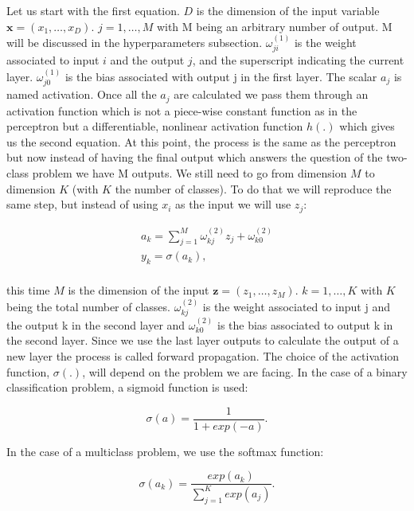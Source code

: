 \documentclass[a4paper,12pt]{article}
\numberwithin{equation}{section}
\begin{document}
Let us start with the first equation. $D$ is the dimension of the input variable $\boldsymbol{x} = (x_1,\dots,x_D)$. $j = 1,\dots,M$ with M being an arbitrary number of output. M will be discussed in the hyperparameters subsection. $\omega_{ji}^{(1)}$ is the weight associated to input $i$ and the output $j$, and the superscript indicating the current layer. $\omega_{j0}^{(1)}$ is the bias associated with output j in the first layer. The scalar $a_j$ is named activation. Once all the $a_j$ are calculated we pass them through an activation function which is not a piece-wise constant function as in the perceptron but a differentiable, nonlinear activation function $h(.)$ which gives us the second equation. At this point, the process is the same as the perceptron but now instead of having the final output which answers the question of the two-class problem we have M outputs. We still need to go from dimension $M$ to dimension $K$ (with $K$ the number of classes). To do that we will reproduce the same step, but instead of using $x_i$ as the input we will use $z_j$:


\begin{align*}
  a_k = \sum_{j=1}^{M}\omega_{kj}^{(2)}z_j + \omega_{k0}^{(2)} \\
  y_k = \sigma(a_k), \\
\end{align*}

\noindent
this time $M$ is the dimension of the input $\boldsymbol{z} = (z_1,\dots,z_M)$. $k = 1,\dots,K$ with $K$ being the total number of classes. $\omega_{kj}^{(2)}$ is the weight associated to input j and the output k in the second layer and $\omega_{k0}^{(2)}$ is the bias associated to output k in the second layer. Since we use the last layer outputs to calculate the output of a new layer the process is called forward propagation. The choice of the activation function, $\sigma(.)$, will depend on the problem we are facing. In the case of a binary classification problem, a sigmoid function is used:

\begin{equation}\label{eq:5}
\sigma(a) = \frac{1}{1+exp(-a)}.
\end{equation}

In the case of a multiclass problem, we use the softmax function:

\begin{equation}\label{eq:6}
\sigma(a_k) = \frac{exp(a_k)}{\sum_{j=1}^{K}exp(a_j)}.
\end{equation}
\end{document}
